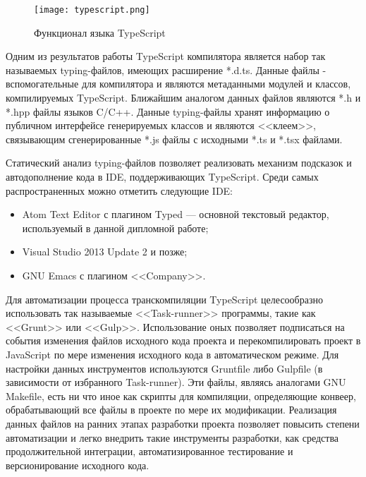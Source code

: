 \begin{figure}[ht]
\centering
  \texttt{[image: typescript.png]}
  \caption{Функционал языка TypeScript}
  \label{fig:theory:typescript:typescript}
\end{figure}

Одним из результатов работы TypeScript компилятора является набор так называемых typing-файлов, имеющих расширение *.d.ts. Данные файлы - вспомогательные для
компилятора и являются метаданными модулей и классов, компилируемых TypeScript. Ближайшим аналогом данных файлов являются *.h и *.hpp файлы языков C/C++. Данные
typing-файлы хранят информацию о публичном интерфейсе генерируемых классов и являются <<клеем>>, связывающим сгенерированные *.js файлы с исходными *.ts и *.tsx файлами.

Статический анализ typing-файлов позволяет реализовать механизм подсказок и автодополнение кода в IDE, поддерживающих TypeScript. Среди самых распространенных
можно отметить следующие IDE:
\begin{itemize}
\item Atom Text Editor с плагином Typed --- основной текстовый редактор, используемый в данной дипломной работе;
\item Visual Studio 2013 Update 2 и позже;
\item GNU Emacs с плагином <<Company>>.
\end{itemize}

Для автоматизации процесса транскомпиляции TypeScript целесообразно использовать так называемые <<Task-runner>> программы, такие как <<Grunt>> или <<Gulp>>.
Использование оных позволяет подписаться на события изменения файлов исходного кода проекта и перекомпилировать проект в JavaScript по мере изменения исходного
кода в автоматическом режиме. Для настройки данных инструментов используются Gruntfile либо Gulpfile (в зависимости от избранного Task-runner). Эти файлы,
являясь аналогами GNU Makefile, есть ни что иное как скрипты для компиляции, определяющие конвеер, обрабатывающий все файлы в проекте по мере их модификации.
Реализация данных файлов на ранних этапах разработки проекта позволяет повысить степени автоматизации и легко внедрить такие инструменты разработки, как
средства продолжительной интеграции, автоматизированное тестирование и версионирование исходного кода.
